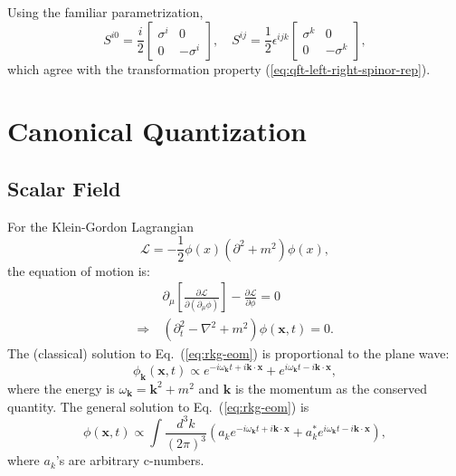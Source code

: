 Using the familiar parametrization,
\begin{equation}
	S^{i0} = \frac{i}{2}\left[\begin{array}{cc}
		\sigma^i & 0 \\ 0 & -\sigma^i
	\end{array}\right], \quad 
	S^{ij} = \frac{1}{2}\epsilon^{ijk} \left[\begin{array}{cc}
		\sigma^k & 0 \\ 0 & -\sigma^k
	\end{array}\right],
\end{equation}
which agree with the transformation property (\ref{eq:qft-left-right-spinor-rep}).



\section{Canonical Quantization}

\subsection{Scalar Field}

For the Klein-Gordon Lagrangian
\begin{equation}
	\mathcal L = -\frac{1}{2}\phi(x)(\partial^2+m^2)\phi(x),
\end{equation}
the equation of motion is:
\begin{equation}\label{eq:rkg-eom}
\begin{aligned}
	&\ \partial_\mu \left[\frac{\partial \mathcal L}{\partial(\partial_\mu \phi)}\right] - \frac{\partial \mathcal L}{\partial \phi} = 0 \\
	\Rightarrow &\
	(\partial_t^2-\nabla^2+m^2)\phi(\bm x,t) = 0.
\end{aligned}
\end{equation}
The (classical) solution to Eq.~(\ref{eq:rkg-eom}) is proportional to the plane wave:
\begin{equation}
	\phi_{\bm k}(\bm x, t) \propto e^{-i\omega_{\bm{k}}t+i\bm{k}\cdot\bm{x}} + e^{i\omega_{\bm{k}}t-i\bm{k}\cdot\bm{x}},
\end{equation}
where the energy is $\omega_{\bm{k}}=\bm{k}^2+m^2$ and $\bm k$ is the momentum as the conserved quantity.
The general solution to Eq.~(\ref{eq:rkg-eom}) is
\begin{equation}
	\phi(\bm x,t) \propto \int \frac{d^{3} k}{(2\pi)^{3}} \left(
		a_{k}e^{-i\omega_{\bm{k}}t+i\bm{k}\cdot\bm{x}} + 
		a^*_{k}e^{i\omega_{\bm{k}}t-i\bm{k}\cdot\bm{x}} 
	\right),
\end{equation}
where $a_k$'s are arbitrary c-numbers.

